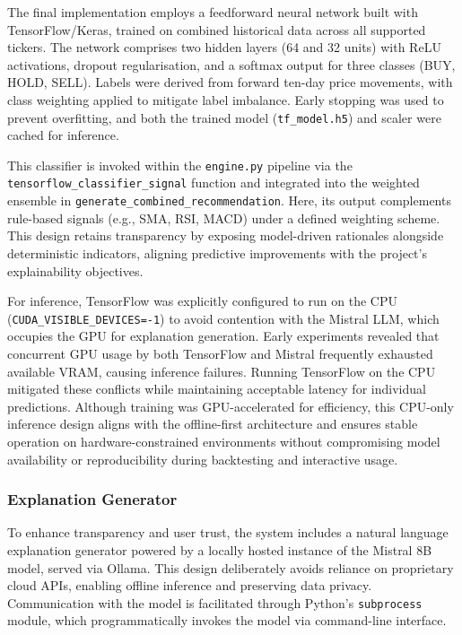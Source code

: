 The final implementation employs a feedforward neural network built with TensorFlow/Keras, trained on combined historical data across all supported tickers. The network comprises two hidden layers (64 and 32 units) with ReLU activations, dropout regularisation, and a softmax output for three classes (BUY, HOLD, SELL). Labels were derived from forward ten-day price movements, with class weighting applied to mitigate label imbalance. Early stopping was used to prevent overfitting, and both the trained model (\texttt{tf\_model.h5}) and scaler were cached for inference.

This classifier is invoked within the \texttt{engine.py} pipeline via the \texttt{tensorflow\_classifier\_signal} function and integrated into the weighted ensemble in \texttt{generate\_combined\_recommendation}. Here, its output complements rule-based signals (e.g., SMA, RSI, MACD) under a defined weighting scheme. This design retains transparency by exposing model-driven rationales alongside deterministic indicators, aligning predictive improvements with the project's explainability objectives.

For inference, TensorFlow was explicitly configured to run on the CPU (\texttt{CUDA\_VISIBLE\_DEVICES=-1}) to avoid contention with the Mistral LLM, which occupies the GPU for explanation generation. Early experiments revealed that concurrent GPU usage by both TensorFlow and Mistral frequently exhausted available VRAM, causing inference failures. Running TensorFlow on the CPU mitigated these conflicts while maintaining acceptable latency for individual predictions. Although training was GPU-accelerated for efficiency, this CPU-only inference design aligns with the offline-first architecture and ensures stable operation on hardware-constrained environments without compromising model availability or reproducibility during backtesting and interactive usage.

\subsubsection{Explanation Generator}

To enhance transparency and user trust, the system includes a natural language explanation generator powered by a locally hosted instance of the Mistral 8B model, served via Ollama. This design deliberately avoids reliance on proprietary cloud APIs, enabling offline inference and preserving data privacy. Communication with the model is facilitated through Python’s \texttt{subprocess} module, which programmatically invokes the model via command-line interface.

